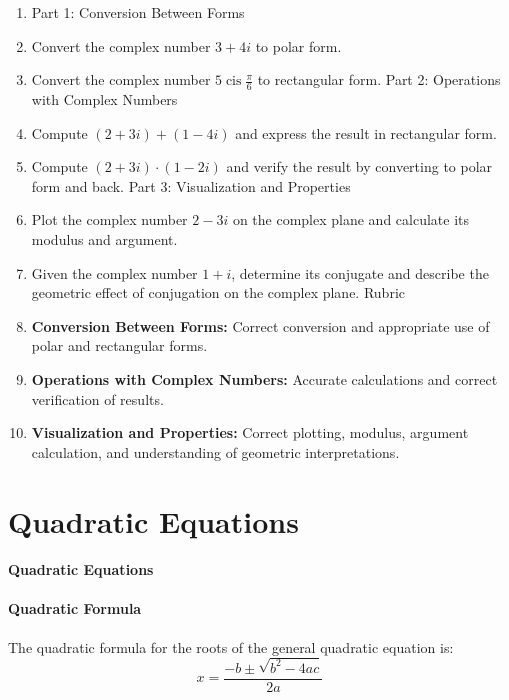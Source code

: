 \begin{enumerate}
    \item Part 1: Conversion Between Forms
    \item Convert the complex number $3 + 4i$ to polar form.
    \item Convert the complex number $5 \operatorname{cis} \frac{\pi}{6}$ to rectangular form. Part 2: Operations with Complex Numbers
    \item Compute $(2 + 3i) + (1 - 4i)$ and express the result in rectangular form.
    \item Compute $(2 + 3i) \cdot (1 - 2i)$ and verify the result by converting to polar form and back. Part 3: Visualization and Properties
    \item Plot the complex number $2 - 3i$ on the complex plane and calculate its modulus and argument.
    \item Given the complex number $1 + i$, determine its conjugate and describe the geometric effect of conjugation on the complex plane. Rubric
    \item \textbf{Conversion Between Forms:} Correct conversion and appropriate use of polar and rectangular forms.
    \item \textbf{Operations with Complex Numbers:} Accurate calculations and correct verification of results.
    \item \textbf{Visualization and Properties:} Correct plotting, modulus, argument calculation, and understanding of geometric interpretations.
\end{enumerate}

\section{Quadratic Equations}
\label{sec:quadratic-equations}

\paragraph{Quadratic Equations}

\paragraph{Quadratic Formula}

The quadratic formula for the roots of the general quadratic equation is:
$$
x = \frac{-b \pm \sqrt{b^2 - 4ac}}{2a}
$$
